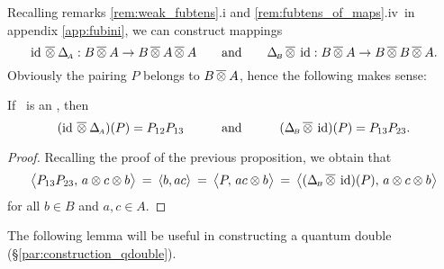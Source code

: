 Recalling remarks \ref{rem:weak_fubtens}.i and \ref{rem:fubtens_of_maps}.iv\
in appendix \ref{app:fubini}, we can construct mappings
$$ \id\, \fubtens \DeltaA : B \fubtens A  \rarr B \fubtens A \fubtens A
         \andspace{2em}
   \DeltaB \fubtens\, \id : B \fubtens A  \rarr B \fubtens B \fubtens A. $$
Obviously the pairing $P$ belongs to $B \fubtens A$,
hence the following makes sense:

\begin{prop_sec}
If\/ \pairAB\ is an \idpa, then
$$ (\id \,\fubtens \DeltaA)(P) = P_{12} P_{13}
          \andspace{3em}
   (\DeltaB \fubtens \, \id)(P) = P_{13} P_{23}.  $$
\end{prop_sec}

\begin{proof}
Recalling the proof of the previous proposition, we obtain that
$$  \pairM{P_{13} P_{23}}{a \tens c \tens b}
   \:=\:
    \pair{b}{ac}
   \:=\:
    \pairM{P}{ac \tens b}
   \:=\:
    \pairM{(\DeltaB \fubtens\, \id)(P)}{a \tens c \tens b}  $$
for all $b\in B$ and $a,c\in A$.
\end{proof}
\vspace{2ex}


The following lemma will be useful in constructing a quantum double
(\S \ref{par:construction_qdouble}).


